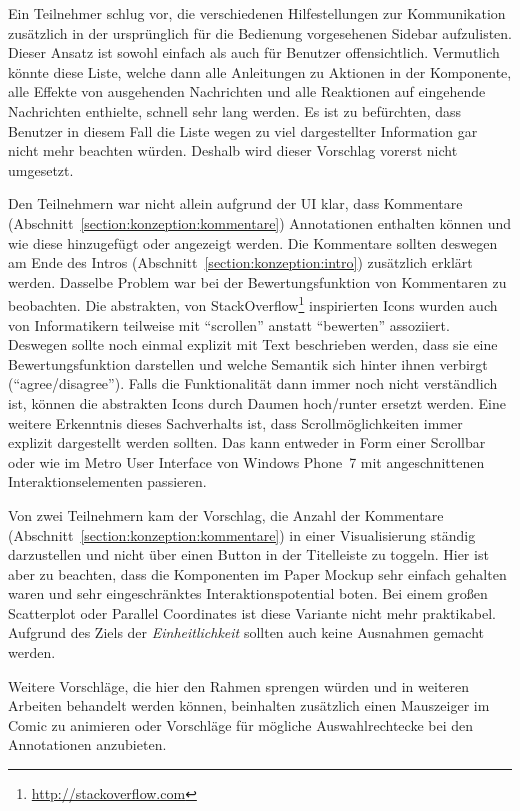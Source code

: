 \documentclass[
	headsepline,
	footsepline,
	fontsize=12pt,
	bibliography=totoc
]{scrbook}
\begin{document}
Ein Teilnehmer schlug vor, die verschiedenen Hilfestellungen zur Kommunikation zusätzlich in der ursprünglich für die Bedienung vorgesehenen Sidebar aufzulisten. Dieser Ansatz ist sowohl einfach als auch für Benutzer offensichtlich. Vermutlich könnte diese Liste, welche dann alle Anleitungen zu Aktionen in der Komponente, alle Effekte von ausgehenden Nachrichten und alle Reaktionen auf eingehende Nachrichten enthielte, schnell sehr lang werden. Es ist zu befürchten, dass Benutzer in diesem Fall die Liste wegen zu viel dargestellter Information gar nicht mehr beachten würden. Deshalb wird dieser Vorschlag vorerst nicht umgesetzt.

Den Teilnehmern war nicht allein aufgrund der UI klar, dass Kommentare (Abschnitt~\ref{section:konzeption:kommentare}) Annotationen enthalten können und wie diese hinzugefügt oder angezeigt werden. Die Kommentare sollten deswegen am Ende des Intros (Abschnitt~\ref{section:konzeption:intro}) zusätzlich erklärt werden. Dasselbe Problem war bei der Bewertungsfunktion von Kommentaren zu beobachten. Die abstrakten, von StackOverflow\footnote{\url{http://stackoverflow.com}} inspirierten Icons wurden auch von Informatikern teilweise mit \enquote{scrollen} anstatt \enquote{bewerten} assoziiert. Deswegen sollte noch einmal explizit mit Text beschrieben werden, dass sie eine Bewertungsfunktion darstellen und welche Semantik sich hinter ihnen verbirgt (\enquote{agree/disagree}). Falls die Funktionalität dann immer noch nicht verständlich ist, können die abstrakten Icons durch Daumen hoch/runter ersetzt werden. Eine weitere Erkenntnis dieses Sachverhalts ist, dass Scrollmöglichkeiten immer explizit dargestellt werden sollten. Das kann entweder in Form einer Scrollbar oder wie im Metro User Interface von Windows Phone~7 mit angeschnittenen Interaktionselementen passieren.

Von zwei Teilnehmern kam der Vorschlag, die Anzahl der Kommentare (Abschnitt~\ref{section:konzeption:kommentare}) in einer Visualisierung ständig darzustellen und nicht über einen Button in der Titelleiste zu toggeln. Hier ist aber zu beachten, dass die Komponenten im Paper Mockup sehr einfach gehalten waren und sehr eingeschränktes Interaktionspotential boten. Bei einem großen Scatterplot oder Parallel Coordinates ist diese Variante nicht mehr praktikabel. Aufgrund des Ziels der \emph{Einheitlichkeit} sollten auch keine Ausnahmen gemacht werden.

Weitere Vorschläge, die hier den Rahmen sprengen würden und in weiteren Arbeiten behandelt werden können, beinhalten zusätzlich einen Mauszeiger im Comic zu animieren oder Vorschläge für mögliche Auswahlrechtecke bei den Annotationen anzubieten.
\end{document}

